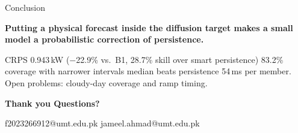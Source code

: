 \documentclass[aspectratio=169,11pt]{beamer}
\begin{document}
\begin{darkframe}
\begin{frame}{Conclusion}
\vspace{1mm}
{\large\bfseries Putting a physical forecast inside the diffusion target makes a small model a probabilistic correction of persistence.\par}
\vspace{3mm}
{\small\color{inmicOnDark} CRPS 0.943\,kW ($-$22.9\% vs.\ B1, 28.7\% skill over smart persistence) \textperiodcentered{} 83.2\% coverage with narrower intervals \textperiodcentered{} median beats persistence \textperiodcentered{} 54\,ms per member. Open problems: cloudy-day coverage and ramp timing.\par}
\vfill
{\Large\bfseries\color{inmicGold} Thank you \textperiodcentered{} Questions?\par}
{\scriptsize\color{inmicOnDark} f2023266912@umt.edu.pk \textperiodcentered{} jameel.ahmad@umt.edu.pk\par}
\vspace{2mm}
\end{frame}
\end{darkframe}
\end{document}

